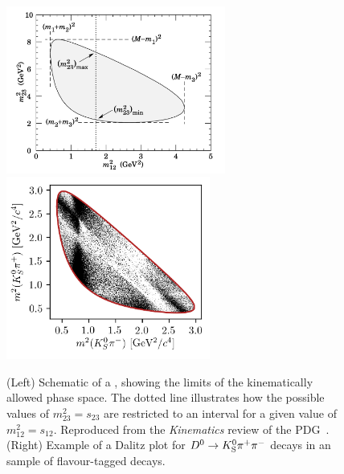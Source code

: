 \begin{figure}[tb]
    \centering
    \includegraphics[height=5.5cm,valign=t]{figures/theory/Dalitz_definitions.png}
    \includegraphics[height=6cm,valign=t]{figures/theory/single_DP_Pi_PiPi_LLandDD_minus.png}
    \caption{(Left) Schematic of a , showing the limits of the kinematically allowed phase space. The dotted line illustrates how the possible values of $m^2_{23}=s_{23}$ are restricted to an interval for a given value of $m^2_{12}=s_{12}$. Reproduced from the \emph{Kinematics} review of the PDG~\cite{PDG2020}. (Right) Example of a Dalitz plot for ${{D}^0}\rightarrow{\ensuremath{{K}^0_{\mathrm{S}}}}{\ensuremath{{\pi}^+}}{\ensuremath{{\pi}^-}}$ decays in an \lhcb sample of flavour-tagged \Dz decays. }
    \label{fig:Dalitz_plot}
\end{figure}

